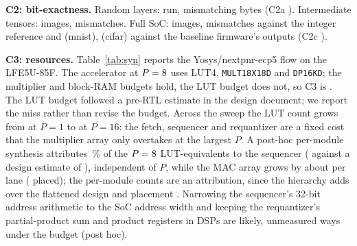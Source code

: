 \documentclass[conference]{IEEEtran}
\begin{document}
\textbf{C2: bit-exactness.} Random layers: \MeasCtwoALayers{} run, \MeasCtwoAMismatch{} mismatching bytes (C2a \VerdictCtwoA). Intermediate tensors: \MeasCtwoBImages{} images, \MeasCtwoBMismatch{} mismatches. Full SoC: \MeasCtwoCImages{} images, \MeasCtwoCMismatch{} mismatches against the integer reference and \MeasCtwoCBaseMnist{} (mnist), \MeasCtwoCBaseCifar{} (cifar) against the baseline firmware's outputs (C2c \VerdictCtwoC).

\textbf{C3: resources.} Table~\ref{tab:syn} reports the Yosys/nextpnr-ecp5 flow on the LFE5U-85F. The accelerator at $P=8$ uses \SynAccelPeightLut{} LUT4, \SynAccelPeightMult{} \texttt{MULT18X18D} and \SynAccelPeightBram{} \texttt{DP16KD}; the multiplier and block-RAM budgets hold, the LUT budget does not, so C3 is \VerdictCthree. The LUT budget followed a pre-RTL estimate in the design document; we report the miss rather than revise the budget. Across the sweep the LUT count grows from \SynAccelPoneLut{} at $P=1$ to \SynAccelPsixteenLut{} at $P=16$: the fetch, sequencer and requantizer are a fixed cost that the multiplier array only overtakes at the largest $P$. A post-hoc per-module synthesis attributes \BrkCtrlShare\,\% of the $P=8$ LUT-equivalents to the sequencer (\BrkCtrlLut{} against a design estimate of \EstCtrlLut{}), independent of $P$, while the MAC array grows by about \BrkMacPerLane{} per lane (\BrkPlacePerLane{} placed); the per-module counts are an attribution, since the hierarchy adds \BrkHierGap{} over the flattened design and placement \BrkPackGap{}. Narrowing the sequencer's 32-bit address arithmetic to the SoC address width and keeping the requantizer's partial-product sum and product registers in DSPs are likely, unmeasured ways under the budget (post hoc).
\end{document}
